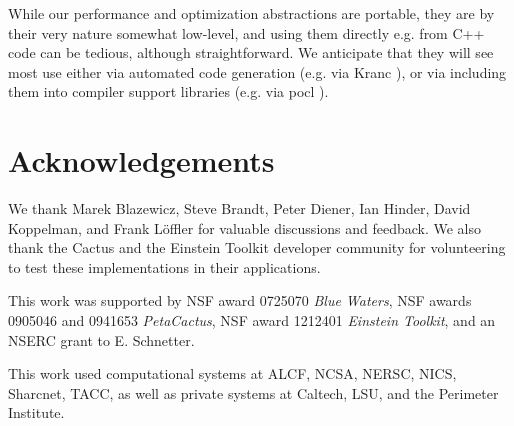 \documentclass[conference]{IEEEtran}
\begin{document}
While our performance and optimization abstractions are portable, they
are by their very nature
somewhat low-level, and using them directly e.g. from C++ code can be
tedious, although straightforward. We anticipate that they
will see most use either via automated code generation (e.g. via Kranc
\cite{Husa:2004ip, Kranc:web}), or via including them into compiler
support libraries (e.g. via pocl \cite{poclweb}).









\section*{Acknowledgements}

We thank Marek Blazewicz, Steve Brandt, Peter Diener, Ian Hinder,
David Koppelman, and Frank L\"offler for valuable discussions and
feedback. We also thank the Cactus and the Einstein Toolkit developer
community for volunteering to test these implementations in their
applications.

This work was supported by NSF award 0725070 \emph{Blue Waters}, NSF
awards 0905046 and 0941653 \emph{PetaCactus}, NSF award 1212401
\emph{Einstein Toolkit}, and an NSERC grant to E. Schnetter.

This work used computational systems at ALCF, NCSA, NERSC, NICS,
Sharcnet, TACC, as well as private systems at Caltech, LSU, and the
Perimeter Institute.





\end{document}
